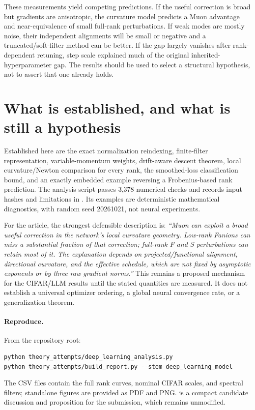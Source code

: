 \documentclass[11pt]{article}
\begin{document}
These measurements yield competing predictions. If the useful correction
is broad but gradients are anisotropic, the curvature model predicts a
Muon advantage and near-equivalence of small full-rank perturbations.
If weak modes are mostly noise, their independent alignments will be small
or negative and a truncated/soft-filter method can be better. If the gap
largely vanishes after rank-dependent retuning, step scale explained much
of the original inherited-hyperparameter gap. The results should be used
to select a structural hypothesis, not to assert that one already holds.

\section{What is established, and what is still a hypothesis}

Established here are the exact normalization reindexing, finite-filter
representation, variable-momentum weights, drift-aware descent theorem,
local curvature/Newton comparison for every rank, the smoothed-loss
classification bound, and an exactly embedded example reversing a
Frobenius-based rank prediction. The analysis script passes 3,378 numerical
checks and records input hashes and limitations in
. Its examples are deterministic
mathematical diagnostics, with random seed 20261021, not neural experiments.

For the article, the strongest defensible description is:
\emph{``Muon can exploit a broad useful correction in the network's local
curvature geometry. Low-rank Fanions can miss a substantial fraction of
that correction; full-rank F and S perturbations can retain most of it.
The explanation depends on projected/functional alignment, directional
curvature, and the effective schedule, which are not fixed by asymptotic
exponents or by three raw gradient norms.''}
This remains a proposed mechanism for the CIFAR/LLM results until the
stated quantities are measured. It does not establish a universal optimizer
ordering, a global neural convergence rate, or a generalization theorem.

\paragraph{Reproduce.}
From the repository root:
\begin{verbatim}
python theory_attempts/deep_learning_analysis.py
python theory_attempts/build_report.py --stem deep_learning_model
\end{verbatim}
The CSV files contain the full rank curves, nominal CIFAR scales, and
spectral filters; standalone figures are provided as PDF and PNG.
 is a compact candidate discussion
and proposition for the submission, which remains unmodified.
\end{document}
